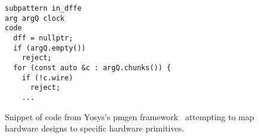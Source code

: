

\begin{figure}[H]
    \centering
\begin{verbatim}
subpattern in_dffe
arg argQ clock
code
  dff = nullptr;
  if (argQ.empty())
    reject;
  for (const auto &c : argQ.chunks()) {
    if (!c.wire)
      reject;
    ...
\end{verbatim}
    \caption{
Snippet of code
  from Yosys's pmgen framework~\cite{yosysxilinxpmgen}
  attempting to map hardware designs
  to specific hardware primitives.
    }
    \label{fig:intro:yosys-pmgen}
\end{figure}

